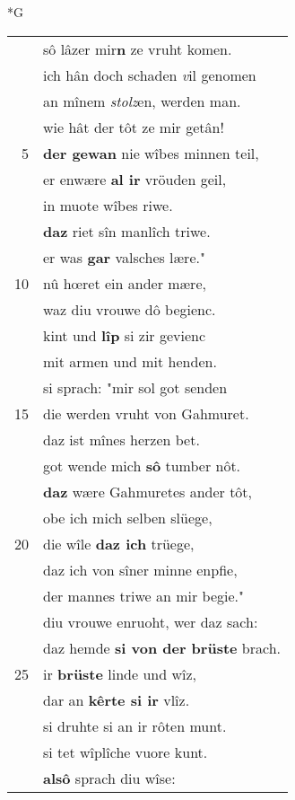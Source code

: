 \documentclass[8pt,a4paper,notitlepage]{article}
\begin{document}
\begin{table}[ht]
\begin{minipage}[t]{0.5\linewidth}
\small
\begin{center}*G
\end{center}
\begin{tabular}{rl}
 & sô lâzer mir\textbf{n} ze vruht komen.\\ 
 & ich hân doch schaden \textit{v}il genomen\\ 
 & an mînem \textit{stolz}en, werden man.\\ 
 & wie hât der tôt ze mir getân!\\ 
5 & \textbf{der gewan} nie wîbes minnen teil,\\ 
 & er enwære \textbf{al ir} vröuden geil,\\ 
 & in muote wîbes riwe.\\ 
 & \textbf{daz} riet sîn manlîch triwe.\\ 
 & er was \textbf{gar} valsches lære."\\ 
10 & nû hœret ein ander mære,\\ 
 & waz diu vrouwe dô begienc.\\ 
 & kint und \textbf{lîp} si zir gevienc\\ 
 & mit armen und mit henden.\\ 
 & si sprach: "mir sol got senden\\ 
15 & die werden vruht von Gahmuret.\\ 
 & daz ist mînes herzen bet.\\ 
 & got wende mich \textbf{sô} tumber nôt.\\ 
 & \textbf{daz} wære Gahmuretes ander tôt,\\ 
 & obe ich mich selben slüege,\\ 
20 & die wîle \textbf{daz ich} trüege,\\ 
 & daz ich von sîner minne enpfie,\\ 
 & der mannes triwe an mir begie."\\ 
 & diu vrouwe enruoht, wer daz sach:\\ 
 & daz hemde \textbf{si von der brüste} brach.\\ 
25 & ir \textbf{brüste} linde und wîz,\\ 
 & dar an \textbf{kêrte si ir} vlîz.\\ 
 & si druhte si an ir rôten munt.\\ 
 & si tet wîplîche vuore kunt.\\ 
 & \textbf{alsô} sprach diu wîse:\\ 

\end{tabular}
\end{minipage}
\end{table}
\end{document}
